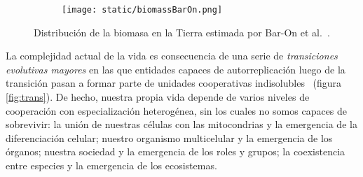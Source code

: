 \documentclass[a4paper,11pt]{book}
\theoremstyle{definition}
\begin{document}
%

\begin{figure}[ht!]
    \centering
    \begin{subfigure}[b]{0.65\textwidth}
    \texttt{[image: static/biomassBarOn.png]}
    \end{subfigure}
    \caption{
	Distribución de la biomasa en la Tierra estimada por Bar-On et al.~\cite{barOn2018-biomass}.
    }
    \label{fig:biomass}
\end{figure}


La complejidad actual de la vida es consecuencia de una serie de \emph{transiciones evolutivas mayores} en las que entidades capaces de autorreplicación luego de la transición pasan a formar parte de unidades cooperativas indisolubles~\cite{maynardSmith1995-majorTransitions, szathmary1995-evolutionaryTransitions, szathmary2015-evolutionaryTransitions} (figura \ref{fig:trans}).
%
De hecho, nuestra propia vida depende de varios niveles de cooperación con especialización heterogénea, sin los cuales no somos capaces de sobrevivir: la unión de nuestras células con las mitocondrias y la emergencia de la diferenciación celular; nuestro organismo multicelular y la emergencia de los órganos; nuestra sociedad y la emergencia de los roles y grupos; la coexistencia entre especies y la emergencia de los ecosistemas.
%
\end{document}
